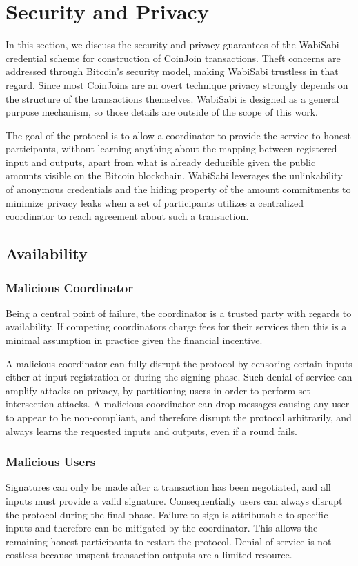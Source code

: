 \documentclass[a4paper]{article}
\begin{document}
\section{Security and Privacy} \label{sec:securitayandprivacy}

In this section, we discuss the security and privacy guarantees of the WabiSabi credential scheme for construction of CoinJoin transactions. Theft concerns are addressed through Bitcoin's security model, making WabiSabi trustless in that regard. Since most CoinJoins are an overt technique privacy strongly depends on the structure of the transactions themselves. WabiSabi is designed as a general purpose mechanism, so those details are outside of the scope of this work.

The goal of the protocol is to allow a coordinator to provide the service to honest participants, without learning anything about the mapping between registered input and outputs, apart from what is already deducible given the public amounts visible on the Bitcoin blockchain. WabiSabi leverages the unlinkability of anonymous credentials and the hiding property of the amount commitments to minimize privacy leaks when a set of participants utilizes a centralized coordinator to reach agreement about such a transaction.

\subsection{Availability}

\subsubsection{Malicious Coordinator}

Being a central point of failure, the coordinator is a trusted party with regards to availability. If competing coordinators charge fees for their services then this is a minimal assumption in practice given the financial incentive.

A malicious coordinator can fully disrupt the protocol by censoring certain inputs either at input registration or during the signing phase. Such denial of service can amplify attacks on privacy, by partitioning users in order to perform set intersection attacks. A malicious coordinator can drop messages causing any user to appear to be non-compliant, and therefore disrupt the protocol arbitrarily, and always learns the requested inputs and outputs, even if a round fails.

\subsubsection{Malicious Users}
Signatures can only be made after a transaction has been negotiated, and all inputs must provide a valid signature. Consequentially users can always disrupt the protocol during the final phase. Failure to sign is attributable to specific inputs and therefore can be mitigated by the coordinator. This allows the remaining honest participants to restart the protocol. Denial of service is not costless because unspent transaction outputs are a limited resource.
\end{document}
